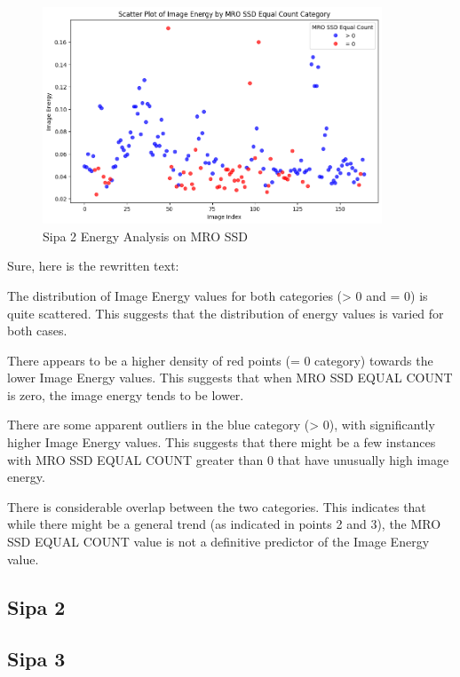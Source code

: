 \begin{figure}[ht]
    \centering
    \includegraphics[width=0.9\textwidth]{Figures/Results/sipa_02/energy.png}
    \caption[Sipa 2 Energy Analysis on MRO SSD]{Sipa 2 Energy Analysis on MRO SSD}
    \label{fig:Sipa 2 Energy Analysis on MRO SSD}
\end{figure}




Sure, here is the rewritten text:

The distribution of Image Energy values for both categories (> 0 and = 0) is quite scattered. This suggests that the distribution of energy values is varied for both cases.

There appears to be a higher density of red points (= 0 category) towards the lower Image Energy values. This suggests that when MRO SSD EQUAL COUNT is zero, the image energy tends to be lower.

There are some apparent outliers in the blue category (> 0), with significantly higher Image Energy values. This suggests that there might be a few instances with MRO SSD EQUAL COUNT greater than 0 that have unusually high image energy.

There is considerable overlap between the two categories. This indicates that while there might be a general trend (as indicated in points 2 and 3), the MRO SSD EQUAL COUNT value is not a definitive predictor of the Image Energy value.

\newpage

\subsection{Sipa 2}
\subsection{Sipa 3}
